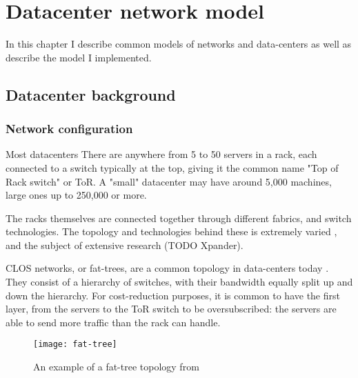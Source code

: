 \chapter{Datacenter network model} \label{model}

In this chapter I describe common models of networks and data-centers as well as describe the model I implemented.

\section{Datacenter background} \label{model-dc}

\subsection{Network configuration} \label{model-network}

Most datacenters \rotornet\cite{handley_re-architecting_2017}\opera {}
There are anywhere from 5 to 50 servers in a rack, each connected to a switch typically at the top, giving it the common name "Top of Rack switch" or ToR. 
A "small" datacenter may have around 5,000 machines, large ones up to 250,000 or more. %

The racks themselves are connected together through different fabrics, and switch technologies.
The topology and technologies behind these is extremely varied \cite{kassing_beyond_2017}, and the subject of extensive research \opera\rotornet (TODO Xpander).  %

CLOS networks, or fat-trees, are a common topology in data-centers  today \cite{singh_jupiter_2015}\cite{noauthor_reinventing_2019}\cite{noauthor_introducing_2014}.
They consist of a hierarchy of switches, with their bandwidth equally split up and down the hierarchy.
For cost-reduction purposes, it is common to have the first layer, from the servers to the ToR switch to be oversubscribed: the servers are able to send more traffic than the rack can handle. 

\begin{figure}[h]
    \centering
    \texttt{[image: fat-tree]}
    \label{fig:fat-tree}
    \caption{An example of a fat-tree topology from \cite{al-fares_scalable_2008}}
\end{figure}

